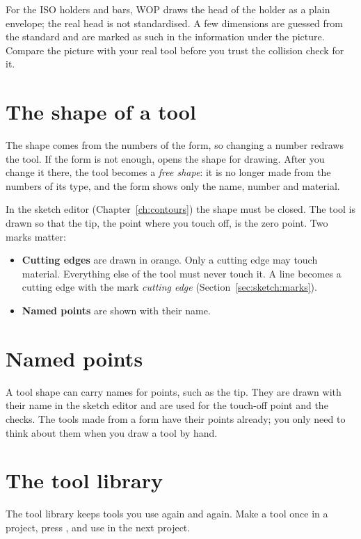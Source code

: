 \begin{notebox}
For the ISO holders and bars, WOP draws the head of the holder as a plain envelope; the real head is not standardised. A few dimensions are guessed from the standard and are marked as such in the information under the picture. Compare the picture with your real tool before you trust the collision check for it.
\end{notebox}

\section{The shape of a tool}\label{sec:tools:shape}
The shape comes from the numbers of the form, so changing a number redraws the tool. If the form is not enough,  opens the shape for drawing. After you change it there, the tool becomes a \emph{free shape}: it is no longer made from the numbers of its type, and the form shows only the name, number and material.

In the sketch editor (Chapter~\ref{ch:contours}) the shape must be closed. The tool is drawn so that the tip, the point where you touch off, is the zero point. Two marks matter:
\begin{itemize}
  \item \textbf{Cutting edges} are drawn in orange. Only a cutting edge may touch material. Everything else of the tool must never touch it. A line becomes a cutting edge with the mark \emph{cutting edge} (Section~\ref{sec:sketch:marks}).
  \item \textbf{Named points} are shown with their name.
\end{itemize}

\section{Named points}\label{sec:tools:points}
A tool shape can carry names for points, such as the tip. They are drawn with their name in the sketch editor and are used for the touch-off point and the checks. The tools made from a form have their points already; you only need to think about them when you draw a tool by hand.

\section{The tool library}\label{sec:tools:library}
The tool library keeps tools you use again and again. Make a tool once in a project, press , and use  in the next project.

